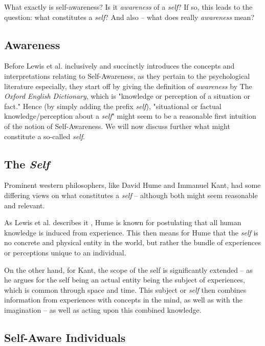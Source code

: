 \documentclass{article}
\begin{document}
What exactly is self-awareness? Is it \textit{awareness} of a \textit{self}? If so, this leads to the question: what constitutes a \textit{self}? And also -- what does really \textit{awareness} mean?
\newline

\subsection{Awareness}

Before Lewis et al. \cite{sacs16_ch2} inclusively and succinctly introduces the concepts and interpretations relating to Self-Awareness, as they pertain to the psychological literature especially, they start off by giving the definition of \textit{awareness} by The \textit{Oxford English Dictionary}, which is "knowledge or perception of a situation or fact." Hence (by simply adding the prefix \textit{self}), "situational or factual knowledge/perception about a \textit{self}" might seem to be a reasonable first intuition of the notion of Self-Awareness. We will now discuss further what might constitute a so-called \textit{self}.

\subsection{The \textit{Self}}

Prominent western philosophers, like David Hume and Immanuel Kant, had some differing views on what constitutes a \textit{self} -- although both might seem reasonable and relevant. 

As Lewis et al. describes it \cite{sacs16_ch2}, Hume is known for postulating that all human knowledge is induced from experience. This then means for Hume that the \textit{self} is no concrete and physical entity in the world, but rather the bundle of experiences or perceptions unique to an individual.

On the other hand, for Kant, the scope of the self is significantly extended -- as he argues for the self being an actual entity being the subject of experiences, which is common through space and time. This subject or \textit{self} then combines information from experiences with concepts in the mind, as well as with the imagination -- as well as acting upon this combined knowledge.

\subsection{Self-Aware Individuals}
\end{document}
